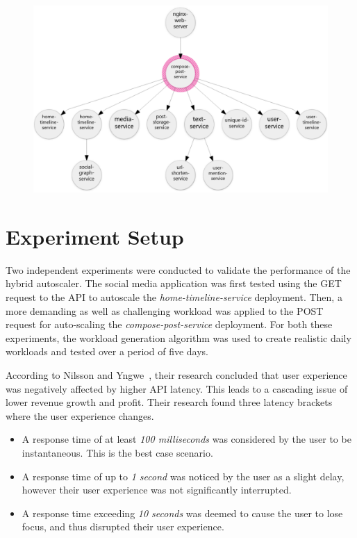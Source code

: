 \begin{figure}[htb]
    \begin{minipage}{0.75\linewidth}
        \includegraphics[width=1.0\linewidth]{Figures/Compose-Post-POST-Trace.pdf}
    \end{minipage}
\end{figure}

\section{Experiment Setup}
\label{sec:ch6-exp-setup}

Two independent experiments were conducted to validate the performance of the hybrid autoscaler. The social media application was first tested using the GET request to the API to autoscale the \textit{home-timeline-service} deployment. Then, a more demanding as well as challenging workload was applied to the POST request for auto-scaling the \textit{compose-post-service} deployment. For both these experiments, the workload generation algorithm was used to create realistic daily workloads and tested over a period of five days.

According to Nilsson and Yngwe~\cite{nilsson2022api}, their research concluded that user experience was negatively affected by higher API latency. This leads to a cascading issue of lower revenue growth and profit. Their research found three latency brackets where the user experience changes.

\begin{itemize}
    \item A response time of at least \textit{100 milliseconds} was considered by the user to be instantaneous. This is the best case scenario.
    \item A response time of up to \textit{1 second} was noticed by the user as a slight delay, however their user experience was not significantly interrupted.
    \item A response time exceeding \textit{10 seconds} was deemed to cause the user to lose focus, and thus disrupted their user experience.
\end{itemize}

